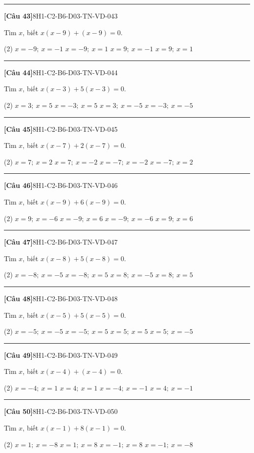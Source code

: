 \documentclass[12pt,a4paper]{article}
\newif\ifloigiai
\newenvironment{cauhoi}[2]{%
  \par\medskip\noindent\rule{\textwidth}{0.4pt}\par\nopagebreak
  \noindent\textbf{[#1]}\hfill{\scriptsize\ttfamily #2}\par\nopagebreak\smallskip}{\par}
\newcommand{\dapan}[1]{\ifloigiai\par\smallskip\noindent\textit{Đáp án:} \textbf{#1}\par\fi}
\begin{document}
\begin{cauhoi}{Câu 43}{8H1-C2-B6-D03-TN-VD-043}
Tìm $x$, biết $x(x-9)+(x-9)=0$.
\begin{tasks}(2)
\task $x=-9;\ x=-1$
\task $x=-9;\ x=1$
\task $x=9;\ x=-1$
\task $x=9;\ x=1$
\end{tasks}
\dapan{C}
\end{cauhoi}
\begin{cauhoi}{Câu 44}{8H1-C2-B6-D03-TN-VD-044}
Tìm $x$, biết $x(x-3)+5(x-3)=0$.
\begin{tasks}(2)
\task $x=3;\ x=5$
\task $x=-3;\ x=5$
\task $x=3;\ x=-5$
\task $x=-3;\ x=-5$
\end{tasks}
\dapan{C}
\end{cauhoi}
\begin{cauhoi}{Câu 45}{8H1-C2-B6-D03-TN-VD-045}
Tìm $x$, biết $x(x-7)+2(x-7)=0$.
\begin{tasks}(2)
\task $x=7;\ x=2$
\task $x=7;\ x=-2$
\task $x=-7;\ x=-2$
\task $x=-7;\ x=2$
\end{tasks}
\dapan{B}
\end{cauhoi}
\begin{cauhoi}{Câu 46}{8H1-C2-B6-D03-TN-VD-046}
Tìm $x$, biết $x(x-9)+6(x-9)=0$.
\begin{tasks}(2)
\task $x=9;\ x=-6$
\task $x=-9;\ x=6$
\task $x=-9;\ x=-6$
\task $x=9;\ x=6$
\end{tasks}
\dapan{A}
\end{cauhoi}
\begin{cauhoi}{Câu 47}{8H1-C2-B6-D03-TN-VD-047}
Tìm $x$, biết $x(x-8)+5(x-8)=0$.
\begin{tasks}(2)
\task $x=-8;\ x=-5$
\task $x=-8;\ x=5$
\task $x=8;\ x=-5$
\task $x=8;\ x=5$
\end{tasks}
\dapan{C}
\end{cauhoi}
\begin{cauhoi}{Câu 48}{8H1-C2-B6-D03-TN-VD-048}
Tìm $x$, biết $x(x-5)+5(x-5)=0$.
\begin{tasks}(2)
\task $x=-5;\ x=-5$
\task $x=-5;\ x=5$
\task $x=5;\ x=5$
\task $x=5;\ x=-5$
\end{tasks}
\dapan{D}
\end{cauhoi}
\begin{cauhoi}{Câu 49}{8H1-C2-B6-D03-TN-VD-049}
Tìm $x$, biết $x(x-4)+(x-4)=0$.
\begin{tasks}(2)
\task $x=-4;\ x=1$
\task $x=4;\ x=1$
\task $x=-4;\ x=-1$
\task $x=4;\ x=-1$
\end{tasks}
\dapan{D}
\end{cauhoi}
\begin{cauhoi}{Câu 50}{8H1-C2-B6-D03-TN-VD-050}
Tìm $x$, biết $x(x-1)+8(x-1)=0$.
\begin{tasks}(2)
\task $x=1;\ x=-8$
\task $x=1;\ x=8$
\task $x=-1;\ x=8$
\task $x=-1;\ x=-8$
\end{tasks}
\dapan{A}
\end{cauhoi}
\end{document}
